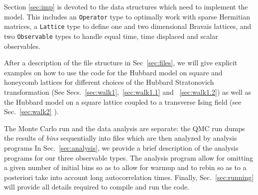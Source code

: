 	   Section \ref{sec:imp} is devoted to the data structures which  need to implement the model.  This includes  an \texttt{Operator} type to  optimally work with sparse Hermitian matrices, a \texttt{Lattice} type  to define one and two dimensional Bravais lattices, and   two   \texttt{Observable} types to handle equal time, time displaced and scalar observables. 
	   
	    After a description of the file structure  in Sec~\ref{sec:files},  we will give explicit examples on how to use the code for  the  Hubbard model on square and honeycomb lattices  for different choices of the Hubbard  Stratonovich transformation  (See Secs.~\ref{sec:walk1},~\ref{sec:walk1.1} and ~\ref{sec:walk1.2})  as well as the Hubbard model on a square lattice coupled to a transverse Ising field (see Sec.~\ref{sec:walk2} ).
	   
      The Monte Carlo run and the  data analysis  are separate: the QMC run  dumps the results of {\it bins}  sequentially into files  which are then analyzed by  analysis programs In Sec.~\ref{sec:analysis}, we provide a brief description of the analysis programs  for our three observable types.  The analysis program allow for omitting a given number of initial bins so as to allow for warmup and to rebin  so as to a posteriori take into account long autocorrelation times.  Finally, Sec.~\ref{sec:running}  will provide all details required to compile and run the code. 
	
		
				


